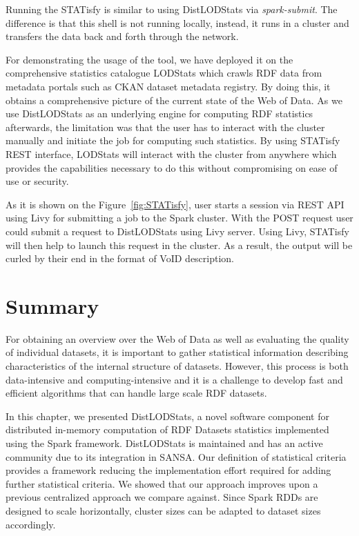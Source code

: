 Running the STATisfy is similar to using DistLODStats via \textit{spark-submit}.
The difference is that this shell is not running locally, instead, it runs in a cluster and transfers the data back and forth through the network.

For demonstrating the usage of the tool, we have deployed it on the comprehensive statistics catalogue LODStats which crawls RDF data from metadata portals such as CKAN dataset metadata registry. By doing this, it obtains a comprehensive picture of the current state of the Web of Data.
As we use DistLODStats as an underlying engine for computing RDF statistics afterwards, the limitation was that the user has to interact with the cluster manually and initiate the job for computing such statistics.
By using STATisfy REST interface, LODStats will interact with the cluster from anywhere which provides the capabilities necessary to do this without compromising on ease of use or security.

As it is shown on the Figure~\ref{fig:STATisfy}, user starts a session via REST API using Livy for submitting a job to the Spark cluster.
With the POST request user could submit a request to DistLODStats using Livy server. 
Using Livy, STATisfy will then help to launch this request in the cluster.
As a result, the output will be curled by their end in the format of VoID description.


\section{Summary}
\label{sec:distlodstats-summary}
For obtaining an overview over the Web of Data as well as evaluating the quality of individual datasets, it is important to gather statistical information describing characteristics of the internal structure of datasets.
However, this process is both data-intensive and computing-intensive and it is a challenge to develop fast and efficient algorithms that can handle large scale RDF datasets.

In this chapter, we presented DistLODStats, a novel software component for distributed in-memory computation of RDF Datasets statistics implemented using the Spark framework.
DistLODStats is maintained and has an active community due to its integration in SANSA. Our definition of statistical criteria provides a framework reducing the implementation effort required for adding further statistical criteria. 
We showed that our approach improves upon a previous centralized approach we compare against.
Since Spark RDDs are designed to scale horizontally, cluster sizes can be adapted to dataset sizes accordingly. 

